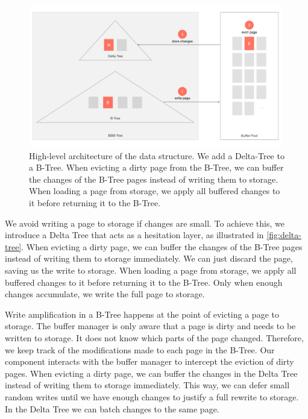 \begin{figure}[htpb]
  \centering
  \includegraphics[width=0.99\textwidth]{figures/delta_tree.pdf}
  \caption{High-level architecture of the data structure. We add a Delta-Tree to a B-Tree. When evicting a dirty page from the B-Tree, we can buffer the changes of the B-Tree pages instead of writing them to storage. When loading a page from storage, we apply all buffered changes to it before returning it to the B-Tree.}
  \label{fig:delta-tree}
\end{figure}

We avoid writing a page to storage if changes are small.
To achieve this, we introduce a Delta Tree that acts as a hesitation layer, as illustrated in \autoref{fig:delta-tree}.
When evicting a dirty page, we can buffer the changes of the B-Tree pages instead of writing them to storage immediately.
We can just discard the page, saving us the write to storage.
When loading a page from storage, we apply all buffered changes to it before returning it to the B-Tree.
Only when enough changes accumulate, we write the full page to storage.

Write amplification in a B-Tree happens at the point of evicting a page to storage.
The buffer manager is only aware that a page is dirty and needs to be written to storage.
It does not know which parts of the page changed.
Therefore, we keep track of the modifications made to each page in the B-Tree.
Our component interacts with the buffer manager to intercept the eviction of dirty pages.
When evicting a dirty page, we can buffer the changes in the Delta Tree instead of writing them to storage immediately.
This way, we can defer small random writes until we have enough changes to justify a full rewrite to storage.
In the Delta Tree we can batch changes to the same page.

